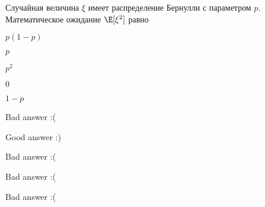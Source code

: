 
\begin{question}
Случайная величина \(\xi\) имеет распределение Бернулли с параметром
\(p\). Математическое ожидание \(\E[\xi^2]\) равно
\begin{answerlist}
  \item \(p(1-p)\)
  \item \(p\)
  \item \(p^2\)
  \item \(0\)
  \item \(1-p\)
\end{answerlist}
\end{question}

\begin{solution}
\begin{answerlist}
  \item Bad answer :(
  \item Good answer :)
  \item Bad answer :(
  \item Bad answer :(
  \item Bad answer :(
\end{answerlist}
\end{solution}

